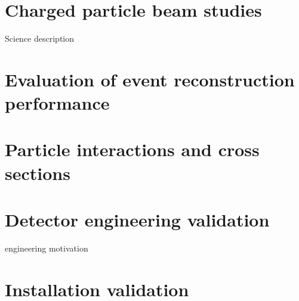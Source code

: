 
\section{Charged particle beam studies}
Science description


\section{Evaluation of event reconstruction performance}


\section{Particle interactions and cross sections}

\section{Detector engineering validation}
engineering motivation

\section{Installation validation}





